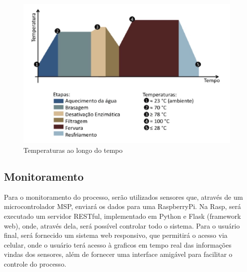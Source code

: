 \begin{figure}[h]
    \centering
    \includegraphics[scale=0.2]{images/grafico2.png}
    \caption{Temperaturas ao longo do tempo}
\end{figure}

\subsection{Monitoramento}

Para o monitoramento do processo, serão utilizados sensores que, através de um microcontrolador MSP, enviará os dados para uma RaspberryPi. Na Rasp, será executado um servidor RESTful, implementado em Python e Flask (framework web), onde, através dela, será possível controlar todo o sistema. Para o usuário final, será fornecido um sistema web responsivo, que permitirá o acesso via celular, onde o usuário terá acesso à graficos em tempo real das informações vindas dos sensores, além de fornecer uma interface amigável para facilitar o controle do processo.